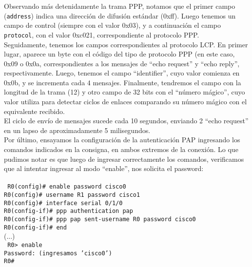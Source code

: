 \documentclass{article}
\begin{document}
Observando más detenidamente la trama PPP, notamos que el primer campo (\texttt{address}) indica una dirección de difusión estándar (0xff). Luego tenemos un campo de control (siempre con el valor 0x03), y a continuación el campo \texttt{protocol}, con el valor 0xc021, correspondiente al protocolo PPP. \\

Seguidamente, tenemos los campos correspondientes al protocolo LCP. En primer lugar, aparece un byte con el código del tipo de protocolo PPP (en este caso, 0x09 o 0x0a, correspondientes a los mensajes de ``echo request'' y ``echo reply'', respectivamente. Luego, tenemos el campo ``identifier'', cuyo valor comienza en 0x0b, y se incrementa cada 4 mensajes. Finalmente, tendremos el campo con la longitud de la trama (12) y otro campo de 32 bits con el ``número mágico'', cuyo valor utiliza para detectar ciclos de enlaces comparando su número mágico con el equivalente recibido. \\

El ciclo de envío de mensajes sucede cada 10 segundos, enviando 2 ``echo request'' en un lapso de aproximadamente 5 milisegundos. \\

Por último, ensayamos la configuración de la autenticación PAP ingresando los comandos indicados en la consigna, en ambos extremos de la conexión. Lo que pudimos notar es que luego de ingresar correctamente los comandos, verificamos que al intentar ingresar al modo ``enable'', nos solicita el password: \\\\
\texttt{
R0(config)\# enable password cisco0 \\
R0(config)\# username R1 password cisco1 \\
R0(config)\# interface serial 0/1/0 \\
R0(config-if)\# ppp authentication pap \\
R0(config-if)\# ppp pap sent-username R0 password cisco0 \\
R0(config-if)\# end \\
}
(...) \\
\texttt{
R0> enable \\
Password: (ingresamos 'cisco0') \\
R0\#
} \\

\newpage
\end{document}
